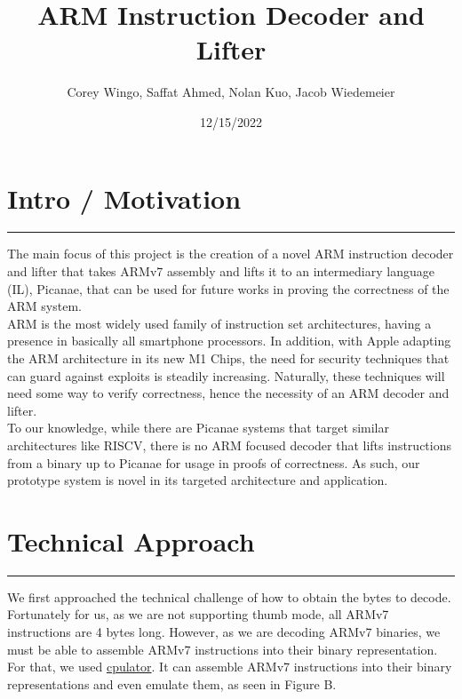 \documentclass{article}
\title{ARM Instruction Decoder and Lifter}
\author{Corey Wingo, Saffat Ahmed, Nolan Kuo, Jacob Wiedemeier}
\date{12/15/2022}
\begin{document}
\maketitle

\section*{Intro / Motivation}
\vspace{0.3cm}
\hrule
\vspace{0.3cm}
The main focus of this project is the creation of a novel ARM instruction decoder and lifter that takes ARMv7 assembly and lifts it to an intermediary language (IL), Picanae, that can be used for future works in proving the correctness of the ARM system.\\

ARM is the most widely used family of instruction set architectures, having a presence in basically all smartphone processors. In addition, with Apple adapting the ARM architecture in its new M1 Chips, the need for security techniques that can guard against exploits is steadily increasing. Naturally, these techniques will need some way to verify correctness, hence the necessity of an ARM decoder and lifter.\\

To our knowledge, while there are Picanae systems that target similar architectures like RISCV, there is no ARM focused decoder that lifts instructions from a binary up to Picanae for usage in proofs of correctness. As such, our prototype system is novel in its targeted architecture and application. 

\pagebreak

\section*{Technical Approach}
\vspace{0.3cm}
\hrule
\vspace{0.3cm}
We first approached the technical challenge of how to obtain the bytes to decode. Fortunately for us, as we are not supporting thumb mode, all ARMv7 instructions are 4 bytes long. However, as we are decoding ARMv7 binaries, we must be able to assemble ARMv7 instructions into their binary representation. For that, we used \href{https://cpulator.01xz.net/?sys=arm}{cpulator}. It can assemble ARMv7 instructions into their binary representations and even emulate them, as seen in Figure B.\\
\end{document}

